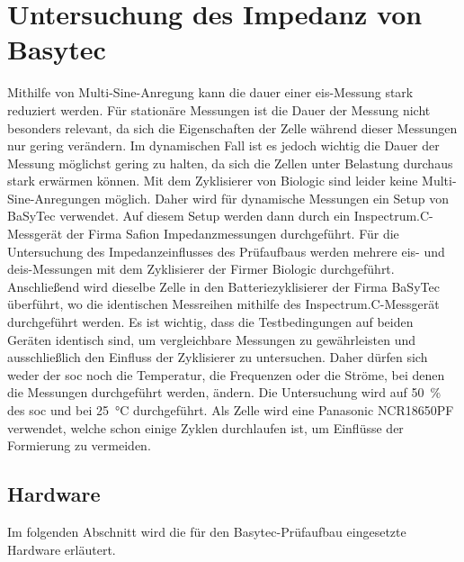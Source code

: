 \section{Untersuchung des Impedanz von Basytec}
\label{sec:basytec}
Mithilfe von Multi-Sine-Anregung kann die dauer einer \gls{eis}-Messung stark reduziert werden.
Für stationäre Messungen ist die Dauer der Messung nicht besonders relevant, da sich die Eigenschaften der Zelle während
dieser Messungen nur gering verändern.
Im dynamischen Fall ist es jedoch wichtig die Dauer der Messung möglichst gering zu halten, da sich die Zellen unter
Belastung durchaus stark erwärmen können.
Mit dem Zyklisierer von Biologic sind leider keine Multi-Sine-Anregungen möglich.
Daher wird für dynamische Messungen ein Setup von BaSyTec verwendet.
Auf diesem Setup werden dann durch ein Inspectrum.C-Messgerät der Firma Safion Impedanzmessungen durchgeführt.
Für die Untersuchung des Impedanzeinflusses des Prüfaufbaus werden mehrere \gls{eis}- und \gls{deis}-Messungen mit dem
Zyklisierer der Firmer Biologic durchgeführt.
Anschließend wird dieselbe Zelle in den Batteriezyklisierer der Firma BaSyTec überführt, wo die identischen
Messreihen mithilfe des Inspectrum.C-Messgerät durchgeführt werden.
Es ist wichtig, dass die Testbedingungen auf beiden Geräten identisch sind, um vergleichbare Messungen zu
gewährleisten und ausschließlich den Einfluss der Zyklisierer zu untersuchen.
Daher dürfen sich weder der \gls{soc} noch die Temperatur, die Frequenzen oder die Ströme, bei denen die Messungen
durchgeführt werden, ändern.
Die Untersuchung wird auf \SI{50}{\%} des \gls{soc} und bei \SI{25}{\degreeCelsius} durchgeführt.
Als Zelle wird eine Panasonic NCR18650PF verwendet, welche schon einige Zyklen durchlaufen ist, um Einflüsse der
Formierung zu vermeiden.

\subsection{Hardware}
\label{subsec:hardware-basy}
Im folgenden Abschnitt wird die für den Basytec-Prüfaufbau eingesetzte Hardware erläutert.

